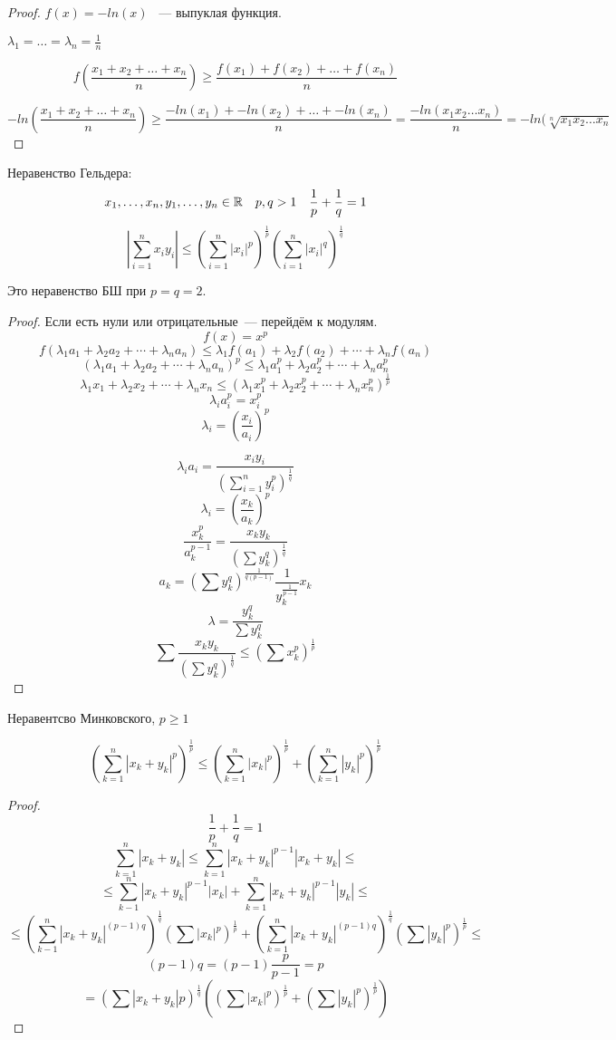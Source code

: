 \begin{proof}
$f(x) = -ln(x)$ ~--- выпуклая функция.

$\lambda_1 = \ldots = \lambda_n = \frac1n$

$$f(\frac{x_1 + x_2 + \ldots + x_n}{n}) \ge \frac{f(x_1) + f(x_2) + \ldots + f(x_n)}{n}$$

$$-ln(\frac{x_1 + x_2 + \ldots + x_n}{n}) \ge \frac{-ln(x_1) + -ln(x_2) + \ldots + -ln(x_n)}{n} = \frac{-ln(x_1x_2\ldots x_n)}{n} = -ln(\sqrt[n]{x_1x_2\ldots x_n}$$


\end{proof}
\begin{conseq}
Неравенство Гельдера:
$$x_1, \ldots, x_n, y_1, \ldots, y_n \in \mathbb{R} \quad p,q > 1 \quad \frac1p + \frac1q = 1$$
$$\left|\sum_{i=1}^n x_iy_i\right| \leqslant \left(\sum_{i=1}^n |x_i|^p\right)^{\frac1p} \left(\sum_{i=1}^n |x_i|^q\right)^{\frac1q}$$
\end{conseq}
\begin{Rem}
Это неравенство БШ при $p=q=2$.
\end{Rem}
\begin{proof}
Если есть нули или отрицательные~--- перейдём к модулям.
$$f(x) = x^p$$
$$f\left( \lambda_1a_1 + \lambda_2a_2 + \cdots + \lambda_n a_n \right) \leqslant \lambda_1f(a_1) + \lambda_2f(a_2) + \cdots + \lambda_nf(a_n)$$
$$\left( \lambda_1a_1 + \lambda_2a_2 + \cdots + \lambda_n a_n \right)^p \leqslant \lambda_1 a_1^p + \lambda_2 a_2^p + \cdots + \lambda_n a_n^p$$
$$\lambda_1x_1 + \lambda_2x_2 + \cdots + \lambda_n x_n \leqslant \left(\lambda_1 x_1^p + \lambda_2 x_2^p + \cdots + \lambda_n x_n^p \right)^{\frac1p}$$
$$ \lambda_i a_i^p = x_i^p $$
$$ \lambda_i = \left(\frac{x_i}{a_i}\right)^p$$

$$ \lambda_i a_i = \frac{x_iy_i}{(\sum_{i=1}^n y_i^p) ^ {\frac1q}}$$
$$\lambda_i  = (\frac{x_k}{a_k})^p$$ 
$$\frac{x_k^{p}}{a_k^{p - 1}} =\frac{x_k y_k}{(\sum y_k^q)^{\frac1q}} $$
$$a_k = (\sum y_k^q)^{\frac{1}{q(p - 1)}}\frac{1}{y_k^{\frac1{p - 1}}}x_k$$
$$\lambda = \frac{y_k^q}{\sum y_k^q}$$
$$\sum\frac{x_k y_k}{(\sum y_k ^q)^{\frac1q}} \le (\sum x_k^p)^{\frac1p} $$
\end{proof}

\begin{conseq}
Неравентсво Минковского, $p \ge 1$

$$(\sum_{k = 1}^{n}|x_k + y_k|^p)^{\frac1p} \le (\sum_{k = 1}^{n}|x_k|^p)^{\frac{1}{p}} + (\sum_{k = 1}^{n}|y_k|^p)^{\frac{1}{p}}$$
\end{conseq}

\begin{proof}
$$\frac1p + \frac1q = 1$$
$$\sum_{k = 1}^{n}|x_k + y_k| \le \sum_{k = 1}^{n}|x_k + y_k|^{p - 1}|x_k + y_k| \le $$
$$ \le \sum_{k - 1}^{n}|x_k + y_k|^{p - 1}|x_k| + \sum_{k = 1}^{n}|x_k + y_k|^{p - 1}|y_k| \le $$
$$ \le (\sum_{k - 1}^{n}|x_k + y_k|^{(p - 1)q})^{\frac1q}(\sum|x_k|^p)^{\frac{1}{p}} + (\sum_{k = 1}^{n}|x_k + y_k|^{(p - 1)q})^{\frac1q}(\sum|y_k|^p)^{\frac{1}{p}} \le $$
$$ (p - 1)q = (p - 1) \frac{p}{p - 1} = p$$
$$ = (\sum|x_k + y_k|p)^{\frac{1}{q}}((\sum|x_k|^{p})^{\frac1p} + (\sum|y_k|^{p})^{\frac{1}{p}})$$
\end{proof}
